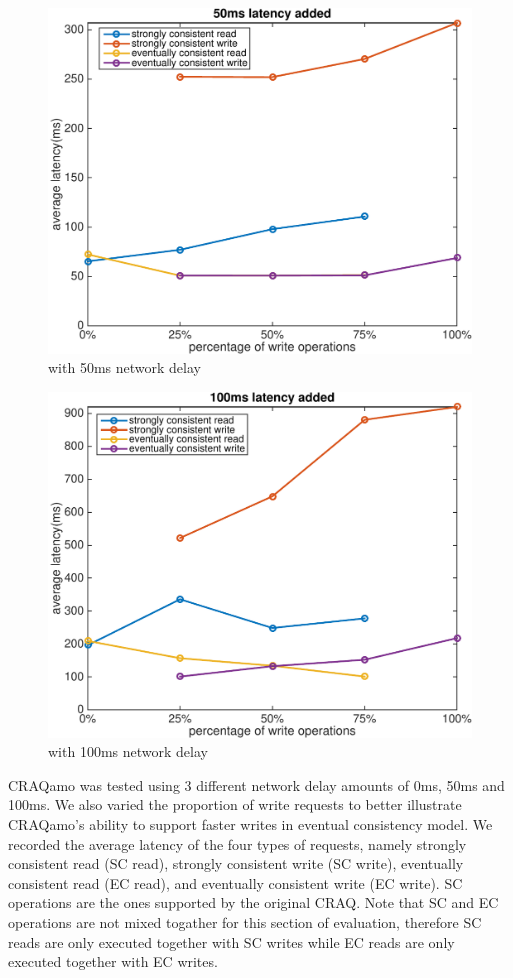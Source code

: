 \begin{figure}[hbt]
\centering
\includegraphics[width=0.95\linewidth]{figures/latency_50.pdf}
\caption{with 50ms network delay}
\label{fig:latency_50}
\end{figure}

\begin{figure}[hbt]
\centering
\includegraphics[width=0.95\linewidth]{figures/latency_100.pdf}
\caption{with 100ms network delay}
\label{fig:latency_100}
\end{figure}
\vspace{-2mm}


CRAQamo was tested using 3 different network delay amounts of 0ms, 50ms and 100ms. We also varied the proportion of write requests to better illustrate CRAQamo's ability to support faster writes in eventual consistency model. We recorded the average latency of the four types of requests, namely strongly consistent read (SC read), strongly consistent write (SC write), eventually consistent read (EC read), and eventually consistent write (EC write). SC operations are the ones supported by the original CRAQ. Note that SC and EC operations are not mixed togather for this section of evaluation, therefore SC reads are only executed together with SC writes while EC reads are only executed together with EC writes. 

